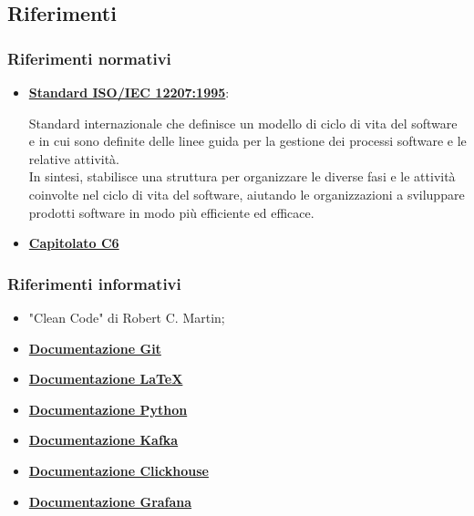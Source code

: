 \subsection{Riferimenti}
\subsubsection{Riferimenti normativi}
\begin{itemize}
    \item \href{https://www.math.unipd.it/~tullio/IS-1/2009/Approfondimenti/ISO_12207-1995.pdf}{\textbf{Standard ISO/IEC 12207:1995}}:
        
    Standard internazionale che definisce un modello di ciclo di vita del software e in cui sono definite delle linee guida per la gestione dei processi software e le relative attività.\\
    In sintesi, stabilisce una struttura per organizzare le diverse fasi e le attività coinvolte nel ciclo di vita del software, aiutando le organizzazioni a sviluppare prodotti software in modo più efficiente ed efficace.

    \item \href{https://www.math.unipd.it/~tullio/IS-1/2023/Progetto/C6.pdf}{\textbf{Capitolato C6}}

\end{itemize}
\subsubsection{Riferimenti informativi}
\begin{itemize}
    \item "Clean Code" di Robert C. Martin;
    \item \href{https://git-scm.com/docs}{\textbf{Documentazione Git}}
    \item \href{https://www.latex-project.org/help/documentation/}{\textbf{Documentazione \LaTeX}}
    \item \href{https://docs.python.org/3/}{\textbf{Documentazione Python}}
    \item \href{https://kafka.apache.org/documentation/}{\textbf{Documentazione Kafka}}
    \item \href{https://clickhouse.com/docs}{\textbf{Documentazione Clickhouse}}
    \item \href{https://grafana.com/docs/grafana/latest/}{\textbf{Documentazione Grafana}}
\end{itemize}

